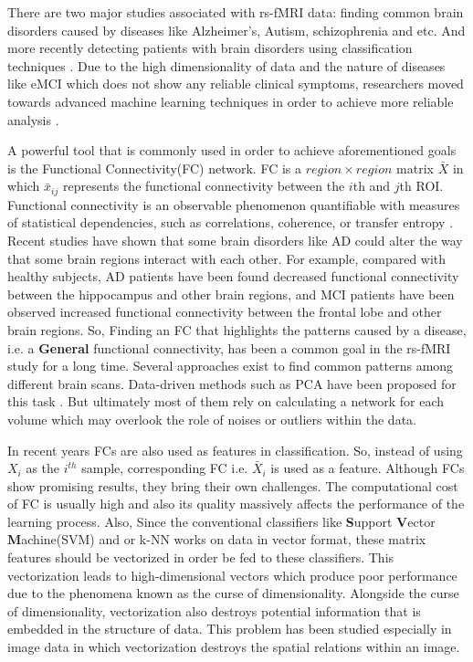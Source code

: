 \documentclass[journal]{IEEEtran}
\begin{document}
      
	There are two major studies associated with rs-fMRI data: finding common brain disorders caused by diseases like Alzheimer's, Autism, schizophrenia and etc. And more recently detecting patients with brain disorders using classification techniques \cite{r35,r36}. Due to the high dimensionality of data and the nature of diseases like eMCI which does not show any reliable clinical symptoms,
	researchers moved towards advanced machine learning techniques in order to achieve more reliable analysis \cite{r37}.
	
	A powerful tool that is commonly used in order to achieve aforementioned goals is the Functional Connectivity(FC) network.  FC is a $region \times region$ matrix $\bar{X}$ in which $\bar{x}_{ij}$ represents the functional connectivity between the $i$th and $j$th ROI. Functional connectivity is an observable
	phenomenon quantifiable with measures of statistical dependencies, such as correlations, coherence, or transfer entropy \cite{r38}.  Recent studies have shown that some brain disorders like AD could alter the way that some brain regions interact with each other. For example, compared with healthy subjects, AD patients have been found decreased functional connectivity between the hippocampus and other brain regions, and MCI patients have been observed increased functional connectivity between the frontal lobe and other brain regions\cite{r04}.
	So, Finding an FC that highlights the patterns caused by a disease, i.e. a \textbf{General} functional connectivity, has been a common goal in the rs-fMRI study for a long time. Several approaches exist to find common patterns among different brain scans. Data-driven methods such as PCA have been proposed for this task \cite{r55}. But ultimately most of them rely on calculating a network for each volume which may overlook the role of noises or outliers within the data\cite{r54}. 
	
	In recent years FCs are also used as features in classification. 
	So, instead of using $X_i$ as the $i^{th}$ sample,  corresponding  FC i.e. $\bar{X}_i$ is used as a feature. Although FCs show promising results, they bring their own challenges.  The computational cost of FC is usually high and also its quality massively affects the performance of the learning process. Also, Since the conventional classifiers like \textbf{S}upport \textbf{V}ector \textbf{M}achine(SVM) and or k-NN works on data in vector format, these matrix features should be vectorized in order be fed to these classifiers.
	This vectorization leads to high-dimensional vectors which produce poor performance due to the phenomena known as the curse of dimensionality. Alongside the curse of dimensionality, vectorization also destroys potential information that is embedded in the structure of  data. 
	This problem has been studied especially in image data in which vectorization destroys the spatial relations within an image\cite{r60}.
	
\end{document}
